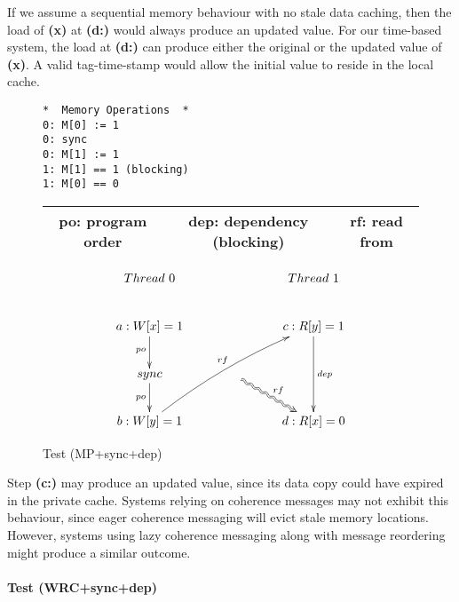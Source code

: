 		If we assume a sequential memory behaviour with no stale data caching, then the load of \textbf{(x)} at \textbf{(d:)} would always produce an updated value. For our time-based system, the load at \textbf{(d:)} can produce either the original or the updated value of \textbf{(x)}. 
		A valid tag-time-stamp would allow the initial value to reside in the local cache.

\begin{figure}[!h]
\begin{tcolorbox}[
colback=green!1!white,
colframe=green!75!black]
\begin{center}
\begin{BVerbatim}
*  Memory Operations  *
0: M[0] := 1
0: sync
0: M[1] := 1
1: M[1] == 1 (blocking)
1: M[0] == 0
\end{BVerbatim}
\end{center}		

\centering
\begin{tabular}{|c|c|c|}
\hline
po: program order & dep: dependency (blocking) & rf: read from \\
\hline
\end{tabular}
\vspace{-9mm}

\begin{displaymath}
	\xymatrix{
		Thread \ 0 & \ \ \ \ \ \  & Thread \ 1 \\
		a: W[x] = 1 \ar[d]_{po} & & c: R[y] = 1 \ar[dd]^{dep} \\
		sync \ar[d]_{po} & \ \ \ \ar@2{~>}[dr]^{rf} & \\
		b: W[y] = 1 \ar@/^/@{->}[uurr]^{rf} & & d: R[x] = 0
	}
\end{displaymath}
\end{tcolorbox}
\caption{Test (MP+sync+dep)}
\label{mp_sync_dep_diagram}
\end{figure}

\clearpage
		Step \textbf{(c:)} may produce an updated value, since its data copy could have expired in the private cache. Systems relying on coherence messages may not exhibit this behaviour, since eager coherence messaging will evict stale memory locations. However, systems using lazy coherence messaging along with message reordering might produce a similar outcome.

\paragraph{Test (WRC+sync+dep)}
		
